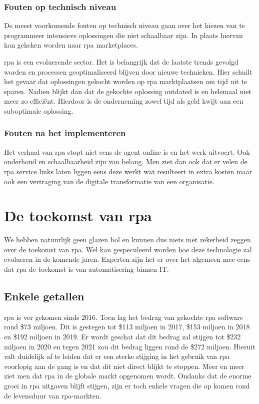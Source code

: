 \subsubsection{Fouten op technisch niveau}
De meest voorkomende fouten op technisch niveau gaan over het kiezen van te programmeer intensieve oplossingen die niet schaalbaar zijn. In plaats hiervan kan gekeken worden naar \acrshort{rpa} marketplaces. \autocite{pitfallsRPA}

\acrshort{rpa} is een evoluerende sector. Het is belangrijk dat de laatste trends gevolgd worden en processen geoptimaliseerd blijven door nieuwe technieken. Hier schuilt het gevaar dat oplossingen gekocht worden op \acrshort{rpa} marktplaatsen om tijd uit te sparen. Nadien blijkt dan dat de gekochte oplossing outdated is en helemaal niet meer zo efficiënt. Hierdoor is de onderneming zowel tijd als geld kwijt aan een suboptimale oplossing. \autocite{pitfallsRPA}

\subsubsection{Fouten na het implementeren}
Het verhaal van \acrshort{rpa} stopt niet eens de agent online is en het werk uitvoert. Ook onderhoud en schaalbaarheid zijn van belang. Men ziet dan ook dat er velen de \acrshort{rpa} service links laten liggen eens deze werkt wat resulteert in extra kosten maar ook een vertraging van de digitale transformatie van een organisatie. \autocite{pitfallsRPA}

\section{De toekomst van \acrshort{rpa}}
We hebben natuurlijk geen glazen bol en kunnen dus niets met zekerheid zeggen over de toekomst van \acrshort{rpa}. Wel kan gespeculeerd worden hoe deze technologie zal evolueren in de komende jaren. Experten zijn het er over het algemeen mee eens dat \acrshort{rpa} de toekomst is van automatisering binnen IT. \autocite{futRPA}

\subsection{Enkele getallen}
\acrshort{rpa} is ver gekomen sinds 2016. Toen lag het bedrag van gekochte \acrshort{rpa} software rond \$73 miljoen. Dit is gestegen tot \$113 miljoen in 2017, \$153 miljoen in 2018 en \$192 miljoen in 2019. Er wordt geschat dat dit bedrag zal stijgen tot \$232 miljoen in 2020 en tegen 2021 zou dit bedrag liggen rond de \$272 miljoen. Hieruit valt duidelijk af te leiden dat er een sterke stijging in het gebruik van \acrshort{rpa} voorlopig aan de gang is en dat dit niet direct blijkt te stoppen. Meer en meer ziet men dat \acrshort{rpa} in de globale markt opgenomen wordt. \autocite{futRPA} Ondanks dat de enorme groei in \acrshort{rpa} uitgaven blijft stijgen, zijn er toch enkele vragen die op komen rond de levensduur van \acrshort{rpa}-markten. \autocite{everythingRPA}

